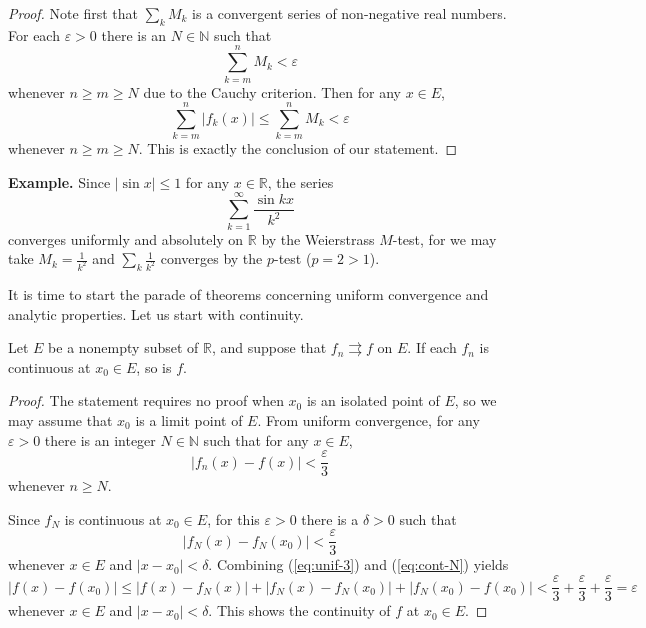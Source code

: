 \documentclass[11pt]{article}
\begin{document}
\begin{proof}
  Note first that $\sum_k M_k$ is a convergent series of non-negative real numbers.
  For each $\varepsilon > 0$ there is an $N \in \mathbb{N}$ such that
  \[
    \sum_{k=m}^n M_k < \varepsilon
  \]
  whenever $n \geqslant m \geqslant N$ due to the Cauchy criterion.
  Then for any $x \in E$,
  \[
    \sum_{k=m}^n |f_k(x)| \leqslant \sum_{k=m}^n M_k < \varepsilon
  \]
  whenever $n \geqslant m \geqslant N$.  This is exactly the conclusion of our statement.
\end{proof}

\noindent\textbf{Example.} Since $|\sin x| \leqslant 1$ for any $x \in \mathbb{R}$, the series
\[
  \sum_{k=1}^\infty \frac{\sin kx}{k^2}
\]
converges uniformly and absolutely on $\mathbb{R}$ by the Weierstrass $M$-test, for we may take $M_k = \frac1{k^2}$ and $\sum_k \frac{1}{k^2}$ converges by the $p$-test ($p = 2 > 1$).

\medskip
It is time to start the parade of theorems concerning uniform convergence and analytic properties.
Let us start with continuity.

\begin{thm}
  \label{thm:unif-cont}
  Let $E$ be a nonempty subset of $\mathbb{R}$, and suppose that $f_n \rightrightarrows f$ on $E$.
  If each $f_n$ is continuous at $x_0 \in E$, so is $f$.
\end{thm}

\begin{proof}
  The statement requires no proof when $x_0$ is an isolated point of $E$, so we may assume that $x_0$ is a limit point of $E$.
  From uniform convergence, for any $\varepsilon > 0$ there is an integer $N \in \mathbb{N}$ such that for any $x \in E$,
  \begin{equation}
    \label{eq:unif-3}
    |f_n(x) - f(x)| < \frac{\varepsilon}{3}
  \end{equation}
  whenever $n \geqslant N$.
  
  Since $f_N$ is continuous at $x_0 \in E$, for this $\varepsilon > 0$ there is a $\delta > 0$ such that
  \begin{equation}
    \label{eq:cont-N}
    |f_N(x) - f_N(x_0)| < \frac{\varepsilon}{3}
  \end{equation}
  whenever $x \in E$ and $|x - x_0| < \delta$.  Combining (\ref{eq:unif-3}) and (\ref{eq:cont-N}) yields
  \[
    |f(x) - f(x_0)| \leqslant |f(x) - f_N(x)| + |f_N(x) - f_N(x_0)| + |f_N(x_0) - f(x_0)| < \frac{\varepsilon}{3} + \frac{\varepsilon}{3} + \frac{\varepsilon}{3} = \varepsilon
  \]
  whenever $x \in E$ and $|x - x_0|<\delta$.  This shows the continuity of $f$ at $x_0 \in E$.
\end{proof}
\end{document}
